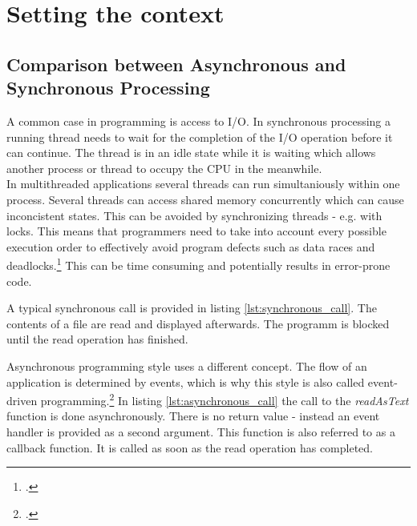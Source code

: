 \section{Setting the context}
\label{setting_the_context}

\subsection{Comparison between Asynchronous and Synchronous Processing}
\label{comparison}

A common case in programming is access to I/O.
In synchronous processing a running thread needs to wait for the completion of
the I/O operation before it can continue.
The thread is in an idle state while it is waiting which allows another process 
or thread to occupy the CPU in the meanwhile.\\

In multithreaded applications several threads can run simultaniously within one 
process. Several threads can access shared memory concurrently which can
cause inconcistent states. This can be avoided by synchronizing threads - e.g.
with locks. This means that programmers need to take into account every possible
execution order to effectively avoid program defects such as data races and 
deadlocks.\footcite[Cf.][10]{Breshears_2009}
This can be time consuming and potentially results in error-prone code.

A typical synchronous call is provided in listing \ref{lst:synchronous_call}. The
contents of a file are read and displayed afterwards. The programm is blocked until the
read operation has finished.




Asynchronous programming style uses a different concept. The flow of an
application is determined by events, which is why this style is also called
event-driven programming.\footcite[Cf.][16]{teixeira_2012} In listing \ref{lst:asynchronous_call} the call
to the \textit{readAsText} function is done asynchronously. There is no
return value - instead an event handler is provided as a second argument.
This function is also referred to as a callback function. It is called
as soon as the read operation has completed.

